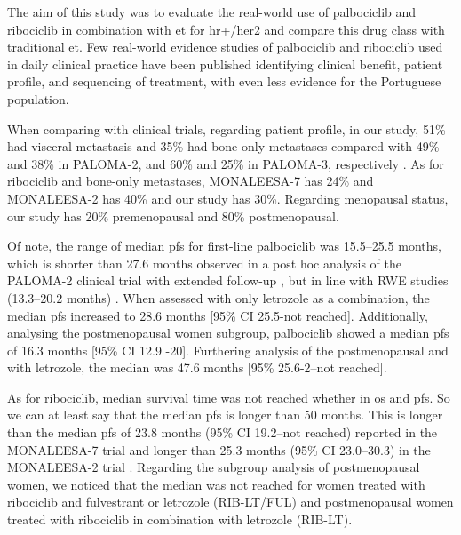 The aim of this study was to evaluate the real-world use of palbociclib and ribociclib in combination with \ac{et} for \ac{hr+}/\ac{her2} and compare this drug class with traditional \ac{et}. Few real-world evidence studies of palbociclib and ribociclib used in daily clinical practice have been published identifying clinical benefit, patient profile, and sequencing of treatment, with even less evidence for the Portuguese population.

When comparing with clinical trials, regarding patient profile, in our study, 51\% had visceral metastasis and 35\% had bone-only metastases compared with 49\% and 38\% in PALOMA-2, and 60\% and 25\% in PALOMA-3, respectively \cite{rugoImpactPalbociclibLetrozole2018,cristofanilliFulvestrantPalbociclibFulvestrant2016a}.
As for ribociclib and bone-only metastases, MONALEESA-7 \cite{tripathyRibociclibEndocrineTherapy2018} has 24\% and MONALEESA-2 has 40\% \cite{hortobagyiUpdatedResultsMONALEESA22018} and our study has 30\%. Regarding menopausal status, our study has 20\% premenopausal and 80\% postmenopausal. 



Of note, the range of median \ac{pfs} for first-line palbociclib was 15.5–25.5 months, which is shorter than 27.6 months observed in a post hoc analysis of the PALOMA-2 clinical trial with extended follow-up \cite{rugoImpactPalbociclibLetrozole2018}, but in line with RWE studies (13.3–20.2 months) \cite{harbeckCDK4InhibitorsHR2021}. When assessed with only letrozole as a combination, the median \ac{pfs} increased to 28.6 months [95\% CI 25.5-not reached]. Additionally, analysing the postmenopausal women subgroup, palbociclib showed a median \ac{pfs} of 16.3 months [95\% CI 12.9 -20]. Furthering analysis of the postmenopausal and with letrozole, the median was 47.6 months [95\% 25.6-2–not reached].

As for ribociclib, median survival time was not reached whether in \ac{os} and \ac{pfs}. So we can at least say that the median \ac{pfs} is longer than 50 months. This is longer than the median \ac{pfs} of 23.8 months (95\% CI 19.2–not reached) reported in the MONALEESA-7 trial \cite{tripathyRibociclibEndocrineTherapy2018} and longer than  25.3 months (95\% CI 23.0–30.3) in the MONALEESA-2 trial \cite{hortobagyiUpdatedResultsMONALEESA22018}. Regarding the subgroup analysis of postmenopausal women, we noticed that the median was not reached for women treated with ribociclib and fulvestrant or letrozole (RIB-LT/FUL) and postmenopausal women treated with ribociclib in combination with letrozole (RIB-LT).

